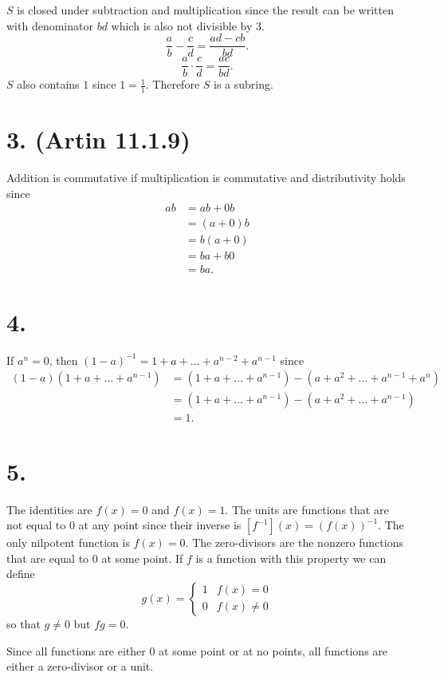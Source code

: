 \documentclass{article}
\begin{document}
$S$ is closed under subtraction and multiplication
since the result can be written with denominator $bd$ 
which is also not divisible by $3$.
\[
	\frac{a}{b} - \frac{c}{d} = \frac{ad-cb}{bd}.
\]
\[
	\frac{a}{b} \cdot \frac{c}{d} = \frac{ac}{bd}.
\]
$S$ also contains $1$ since $1 = \frac{1}{1}$.
Therefore $S$ is a subring.
\newpage 

\section*{3. (Artin 11.1.9)}
Addition is commutative if multiplication is commutative
and distributivity holds since 
\begin{align*}
	ab &= ab + 0b \\
	&= (a+0)b \\
	&= b(a+0) \\
	&= ba + b0 \\
	&= ba.
\end{align*}
\newpage 

\section*{4.}
If $a^n = 0$, then $(1-a)^{-1} = 1+a+\ldots+a^{n-2}+a^{n-1}$ since 
\begin{align*}
	(1-a)(1+a+\ldots+a^{n-1}) &= (1+a+\ldots+a^{n-1}) - (a+a^2+\ldots+a^{n-1}+a^n) \\
	&= (1+a+\ldots+a^{n-1}) - (a+a^2+\ldots+a^{n-1}) \\
	&= 1.
\end{align*}
\newpage

\section*{5.}
The identities are $f(x) = 0$ and $f(x) = 1$.
The units are functions that are not equal to $0$
at any point since their inverse 
is $[f^{-1}](x) = (f(x))^{-1}$.
The only nilpotent function is $f(x) = 0$.
The zero-divisors are the nonzero functions that 
are equal to $0$ at some point.
If $f$ is a function with this property we can define 
\[
	g(x) = \begin{cases}
		1 & f(x) = 0 \\
		0 & f(x) \neq 0
	\end{cases}
\]
so that $g \neq 0$ but $fg = 0$.

Since all functions are either $0$ at some point
or at no points, all functions are either 
a zero-divisor or a unit.
\newpage 
\end{document}
